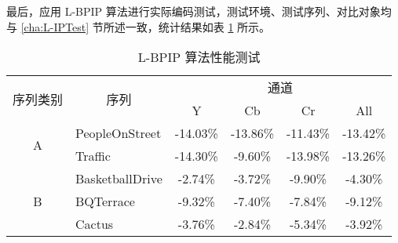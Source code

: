 最后，应用 L-BPIP 算法进行实际编码测试，测试环境、测试序列、对比对象均与 \ref{cha:L-IPTest} 节所述一致，统计结果如表 \ref{tab:L-BPIPSummary} 所示。
\begin{table}[!p]
    \caption{L-BPIP 算法性能测试}
    \label{tab:L-BPIPSummary}
    \begin{minipage}{\linewidth}
        \centering
        \begin{tabular}{@{}clcccc@{}}
            \toprule
            \multirow{2}{*}{序列类别}              & \multicolumn{1}{c}{\multirow{2}{*}{序列}} & \multicolumn{4}{c}{通道}                                                                                                                                                        \\ \cmidrule(l){3-6}
                                                   & \multicolumn{1}{c}{}                      & Y                        & Cb       & Cr                  & All                                                                                                                 \\ \midrule
            \multirow{2}{*}{A}                     & PeopleOnStreet                            & -14.03\%                 & -13.86\% & -11.43\%            & -13.42\%                                                                                                            \\
                                                   & Traffic                                   & -14.30\%                 & -9.60\%  & -13.98\%            & -13.26\%                                                                                                            \\
            \multirow{5}{*}{B}                     & BasketballDrive                           & -2.74\%                  & -3.72\%  & -9.90\%             & -4.30\%                                                                                                             \\
                                                   & BQTerrace                                 & -9.32\%                  & -7.40\%  & -7.84\%             & -9.12\%                                                                                                             \\
                                                   & Cactus                                    & -3.76\%                  & -2.84\%  & -5.34\%             & -3.92\%                                                                                                             \\

\end{tabular}
\end{minipage}
\end{table}
